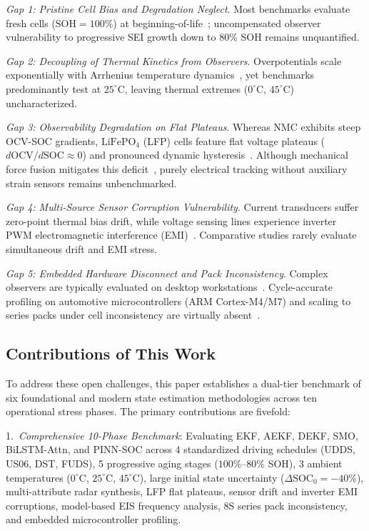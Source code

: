 \documentclass[balance,nocopyright,upint,varvw,hyphenate,barcolor=NavyBlue,nolists]{asmejour}
\begin{document}
\emph{Gap 1: Pristine Cell Bias and Degradation Neglect}. Most benchmarks evaluate fresh cells ($\text{SOH} = 100\%$) at beginning-of-life~\cite{Hu2012ecm,Chemali2018dnn,Le2026charging}; uncompensated observer vulnerability to progressive SEI growth down to $80\%$ SOH remains unquantified.

\emph{Gap 2: Decoupling of Thermal Kinetics from Observers}. Overpotentials scale exponentially with Arrhenius temperature dynamics~\cite{He2011ecm,Ren2019aging}, yet benchmarks predominantly test at $25^\circ\text{C}$, leaving thermal extremes ($0^\circ\text{C}$, $45^\circ\text{C}$) uncharacterized.

\emph{Gap 3: Observability Degradation on Flat Plateaus}. Whereas NMC exhibits steep OCV-SOC gradients, $\text{LiFePO}_4$ (LFP) cells feature flat voltage plateaus ($d\text{OCV}/d\text{SOC} \approx 0$) and pronounced dynamic hysteresis~\cite{Roscher2011hysteresis,Verbrugge2004hysteresis,Theiler2024hysteresis}. Although mechanical force fusion mitigates this deficit~\cite{Tian2025}, purely electrical tracking without auxiliary strain sensors remains unbenchmarked.

\emph{Gap 4: Multi-Source Sensor Corruption Vulnerability}. Current transducers suffer zero-point thermal bias drift, while voltage sensing lines experience inverter PWM electromagnetic interference (EMI)~\cite{Hashemi2020,Zheng2018inconsistency}. Comparative studies rarely evaluate simultaneous drift and EMI stress.

\emph{Gap 5: Embedded Hardware Disconnect and Pack Inconsistency}. Complex observers are typically evaluated on desktop workstations~\cite{Song2019bilstm,Bhattacharya2024gpr}. Cycle-accurate profiling on automotive microcontrollers (ARM Cortex-M4/M7) and scaling to series packs under cell inconsistency are virtually absent~\cite{Yang2024degradation,Zheng2018inconsistency}.

\subsection{Contributions of This Work}
To address these open challenges, this paper establishes a dual-tier benchmark of six foundational and modern state estimation methodologies across ten operational stress phases. The primary contributions are fivefold:

1.~\emph{Comprehensive 10-Phase Benchmark}: Evaluating EKF, AEKF, DEKF, SMO, BiLSTM-Attn, and PINN-SOC across 4 standardized driving schedules (UDDS, US06, DST, FUDS), 5 progressive aging stages ($100\%\text{--}80\%$ SOH), 3 ambient temperatures ($0^\circ\text{C}$, $25^\circ\text{C}$, $45^\circ\text{C}$), large initial state uncertainty ($\Delta\text{SOC}_0 = -40\%$), multi-attribute radar synthesis, LFP flat plateaus, sensor drift and inverter EMI corruptions, model-based EIS frequency analysis, 8S series pack inconsistency, and embedded microcontroller profiling.
\end{document}
